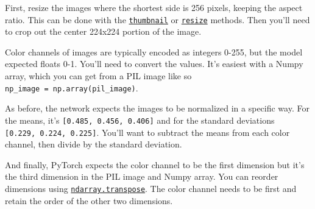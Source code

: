 \documentclass[11pt]{article}
\begin{document}
First, resize the images where the shortest side is 256 pixels, keeping
the aspect ratio. This can be done with the
\href{http://pillow.readthedocs.io/en/3.1.x/reference/Image.html\#PIL.Image.Image.thumbnail}{\texttt{thumbnail}}
or
\href{http://pillow.readthedocs.io/en/3.1.x/reference/Image.html\#PIL.Image.Image.thumbnail}{\texttt{resize}}
methods. Then you'll need to crop out the center 224x224 portion of the
image.

Color channels of images are typically encoded as integers 0-255, but
the model expected floats 0-1. You'll need to convert the values. It's
easiest with a Numpy array, which you can get from a PIL image like so
\texttt{np\_image\ =\ np.array(pil\_image)}.

As before, the network expects the images to be normalized in a specific
way. For the means, it's \texttt{{[}0.485,\ 0.456,\ 0.406{]}} and for
the standard deviations \texttt{{[}0.229,\ 0.224,\ 0.225{]}}. You'll
want to subtract the means from each color channel, then divide by the
standard deviation.

And finally, PyTorch expects the color channel to be the first dimension
but it's the third dimension in the PIL image and Numpy array. You can
reorder dimensions using
\href{https://docs.scipy.org/doc/numpy-1.13.0/reference/generated/numpy.ndarray.transpose.html}{\texttt{ndarray.transpose}}.
The color channel needs to be first and retain the order of the other
two dimensions.
\end{document}

